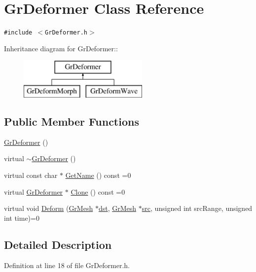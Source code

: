 \hypertarget{class_gr_deformer}{
\section{GrDeformer Class Reference}
\label{class_gr_deformer}
}
{\tt \#include $<$GrDeformer.h$>$}

Inheritance diagram for GrDeformer::\begin{figure}[H]
\begin{center}
\leavevmode
\includegraphics[height=2cm]{class_gr_deformer}
\end{center}
\end{figure}
\subsection*{Public Member Functions}
\begin{CompactItemize}
\item 
\hyperlink{class_gr_deformer_a5b17243ba7878e1b90cb83af9f65454}{GrDeformer} ()
\item 
virtual \hyperlink{class_gr_deformer_b423190f6b4230b156575d5c9894c465}{$\sim$GrDeformer} ()
\item 
virtual const char $\ast$ \hyperlink{class_gr_deformer_c4b54b927f3b2febd0552bc610fe5b41}{GetName} () const =0
\item 
virtual \hyperlink{class_gr_deformer}{GrDeformer} $\ast$ \hyperlink{class_gr_deformer_3a9f2e2afaea68d88f822b8e7daf3c8d}{Clone} () const =0
\item 
virtual void \hyperlink{class_gr_deformer_488a6a9156e48777a0042920cb8dd15e}{Deform} (\hyperlink{class_gr_mesh}{GrMesh} $\ast$\hyperlink{glext__bak_8h_92034251bfd455d524a9b5610cddba00}{dst}, \hyperlink{class_gr_mesh}{GrMesh} $\ast$\hyperlink{glext__bak_8h_72e0fdf0f845ded60b1fada9e9195cd7}{src}, unsigned int srcRange, unsigned int time)=0
\end{CompactItemize}


\subsection{Detailed Description}


Definition at line 18 of file GrDeformer.h.

